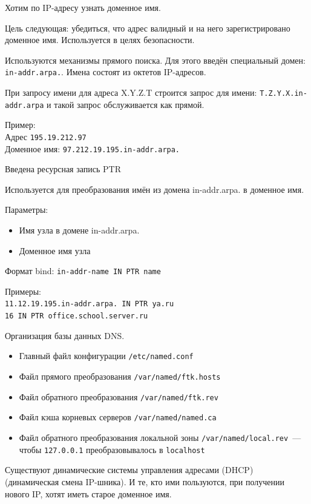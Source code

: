 Хотим по IP-адресу узнать доменное имя. 

Цель следующая: убедиться, что адрес валидный и на него зарегистрировано доменное имя. Используется в целях безопасности.

Используются механизмы прямого поиска. Для этого введён специальный домен: {\tt in-addr.arpa.}. Имена состоят из октетов IP-адресов.

При запросу имени для адреса X.Y.Z.T строится запрос для
имени: {\tt T.Z.Y.X.in-addr.arpa} и такой запрос обслуживается как прямой.

Пример:\\
Адрес {\tt 195.19.212.97}\\
Доменное имя: {\tt 97.212.19.195.in-addr.arpa.}

Введена ресурсная запись PTR

Используется для преобразования имён из домена in-addr.arpa. в доменное имя.

Параметры:
\begin{itemize}
    \item Имя узла в домене in-addr.arpa.
    \item Доменное имя узла
\end{itemize}

Формат bind: {\tt in-addr-name IN PTR name}

Примеры:\\
{\tt 11.12.19.195.in-addr.arpa. IN PTR ya.ru}\\
{\tt 16 IN PTR office.school.server.ru}


Организация базы данных DNS.
\begin{itemize}
    \item Главный файл конфигурации {\tt /etc/named.conf}
    \item Файл прямого преобразования {\tt /var/named/ftk.hosts}
    \item Файл обратного преобразования {\tt /var/named/ftk.rev}
    \item Файл кэша корневых серверов {\tt /var/named/named.ca}
    \item Файл обратного преобразования локальной зоны {\tt /var/named/local.rev}~--- чтобы {\tt 127.0.0.1} преобразовывалось в {\tt localhost}
\end{itemize}



Существуют динамические системы управления адресами (DHCP) (динамическая смена IP-шника). И те, кто ими пользуются, при получении нового IP, хотят иметь старое доменное имя.

